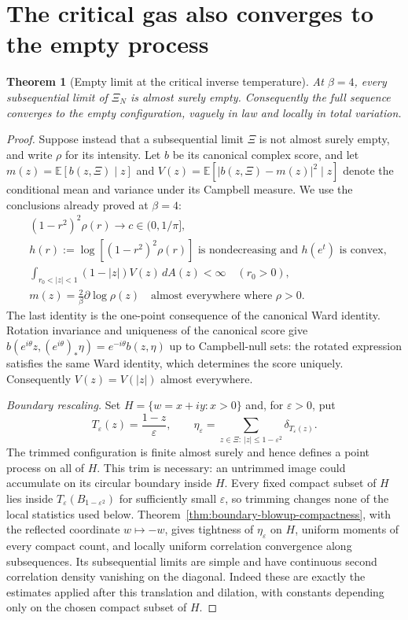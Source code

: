 \documentclass[11pt,a4paper]{article}
\numberwithin{equation}{section}
\newtheorem{theorem}{Theorem}[section]
\theoremstyle{definition}
\theoremstyle{remark}
\newcommand{\E}{\mathbb E}
\begin{document}
\section{The critical gas also converges to the empty process}
\label{sec:critical-force-empty}

\begin{theorem}[Empty limit at the critical inverse temperature]
\label{thm:critical-empty}
At $\beta=4$, every subsequential limit of $\Xi_N$ is almost surely
empty. Consequently the full sequence converges to the empty
configuration, vaguely in law and locally in total variation.
\end{theorem}

\begin{proof}
Suppose instead that a subsequential limit $\Xi$ is not almost surely
empty, and write $\rho$ for its intensity. Let $b$ be its canonical
complex score, and let $m(z)=\E[b(z,\Xi)\mid z]$ and
$V(z)=\E[|b(z,\Xi)-m(z)|^2\mid z]$ denote the conditional mean and
variance under its Campbell measure. We use the conclusions already
proved at $\beta=4$:
\begin{align}
 &(1-r^2)^2\rho(r)\longrightarrow c\in(0,1/\pi],
 \label{eq:critical-proof-intensity}\\
 &h(r):=\log[(1-r^2)^2\rho(r)]
       \text{ is nondecreasing and }h(e^t)\text{ is convex},
 \label{eq:critical-proof-convexity}\\
 &\int_{r_0<|z|<1}(1-|z|)V(z)\,dA(z)<\infty
       \quad (r_0>0),
 \label{eq:critical-proof-variance-integrability}\\
 &m(z)=\frac2\beta\partial\log\rho(z)
       \quad\text{almost everywhere where }\rho>0.
 \label{eq:critical-proof-mean}
\end{align}
The last identity is the one-point consequence of the canonical Ward
identity. Rotation invariance and uniqueness of the canonical score
give
$b(e^{i\theta}z,(e^{i\theta})_*\eta)=e^{-i\theta}b(z,\eta)$
up to Campbell-null sets: the rotated expression satisfies the same
Ward identity, which determines the score uniquely. Consequently
$V(z)=V(|z|)$ almost everywhere.

\emph{Boundary rescaling.}
Set $H=\{w=x+iy:x>0\}$ and, for $\varepsilon>0$, put
\[
 T_\varepsilon(z)=\frac{1-z}{\varepsilon},\qquad
 \eta_\varepsilon=\sum_{z\in\Xi:\ |z|\le1-\varepsilon^2}
                                  \delta_{T_\varepsilon(z)}.
\]
The trimmed configuration is finite almost surely and hence defines a
point process on all of $H$. This trim is necessary: an untrimmed image
could accumulate on its circular boundary inside $H$. Every fixed
compact subset of $H$ lies inside $T_\varepsilon(B_{1-\varepsilon^2})$
for sufficiently small $\varepsilon$, so trimming changes none of the
local statistics used below. Theorem~\ref{thm:boundary-blowup-compactness},
with the reflected coordinate $w\mapsto-w$, gives tightness of $\eta_\varepsilon$ on $H$, uniform moments
of every compact count, and locally uniform correlation convergence
along subsequences. Its subsequential limits are simple and have
continuous second correlation density vanishing on the diagonal.
Indeed these are exactly the estimates applied after this translation
and dilation, with constants depending only on the chosen compact
subset of $H$.


\end{proof}
\end{document}

